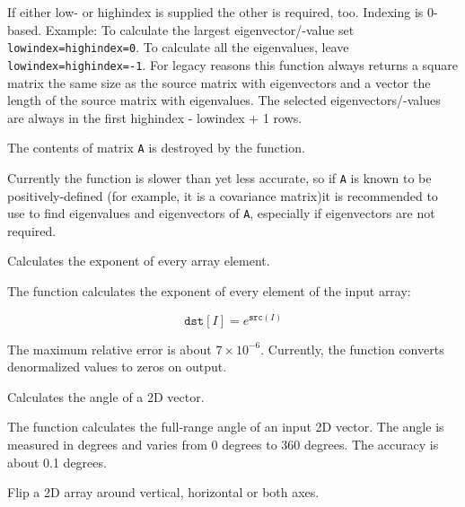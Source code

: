 If either low- or highindex is supplied the other is required, too.
Indexing is 0-based. Example: To calculate the largest eigenvector/-value set
\texttt{lowindex=highindex=0}. To calculate all the eigenvalues, leave \texttt{lowindex=highindex=-1}.
For legacy reasons this function always returns a square matrix the same size
as the source matrix with eigenvectors and a vector the length of the source
matrix with eigenvalues. The selected eigenvectors/-values are always in the
first highindex - lowindex + 1 rows.

The contents of matrix \texttt{A} is destroyed by the function.

Currently the function is slower than  yet less accurate,
so if \texttt{A} is known to be positively-defined (for example, it
is a covariance matrix)it is recommended to use  to find
eigenvalues and eigenvectors of \texttt{A}, especially if eigenvectors
are not required.

Calculates the exponent of every array element.


\begin{description}
\end{description}


The function calculates the exponent of every element of the input array:

\[
\texttt{dst} [I] = e^{\texttt{src}(I)}
\]

The maximum relative error is about $7 \times 10^{-6}$. Currently, the function converts denormalized values to zeros on output.

Calculates the angle of a 2D vector.


\begin{description}
\end{description}


The function calculates the full-range angle of an input 2D vector. The angle is 
measured in degrees and varies from 0 degrees to 360 degrees. The accuracy is about 0.1 degrees.

Flip a 2D array around vertical, horizontal or both axes.

